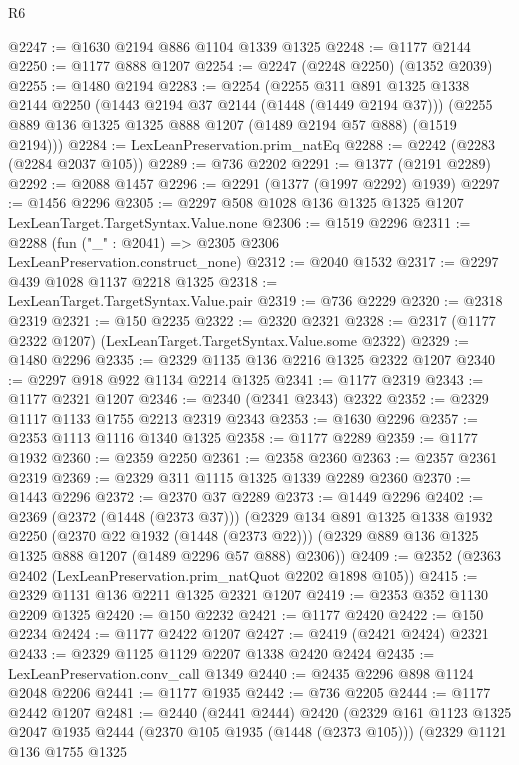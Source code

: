 \begin{lexlean}{R6}
\begin{coremodule}
@2247 := @1630 @2194 @886 @1104 @1339 @1325
@2248 := @1177 @2144
@2250 := @1177 @888 @1207
@2254 := @2247 (@2248 @2250) (@1352 @2039)
@2255 := @1480 @2194
@2283 := @2254
    (@2255
      @311
      @891
      @1325
      @1338
      @2144
      @2250
      (@1443 @2194 @37 @2144 (@1448 (@1449 @2194 @37)))
      (@2255 @889 @136 @1325 @1325 @888 @1207 (@1489 @2194 @57 @888) (@1519 @2194)))
@2284 := LexLeanPreservation.prim_natEq
@2288 := @2242 (@2283 (@2284 @2037 @105))
@2289 := @736 @2202
@2291 := @1377 (@2191 @2289)
@2292 := @2088 @1457
@2296 := @2291 (@1377 (@1997 @2292) @1939)
@2297 := @1456 @2296
@2305 := @2297 @508 @1028 @136 @1325 @1325 @1207 LexLeanTarget.TargetSyntax.Value.none
@2306 := @1519 @2296
@2311 := @2288 (fun ("_" : @2041) => @2305 @2306 LexLeanPreservation.construct_none)
@2312 := @2040 @1532
@2317 := @2297 @439 @1028 @1137 @2218 @1325
@2318 := LexLeanTarget.TargetSyntax.Value.pair
@2319 := @736 @2229
@2320 := @2318 @2319
@2321 := @150 @2235
@2322 := @2320 @2321
@2328 := @2317 (@1177 @2322 @1207) (LexLeanTarget.TargetSyntax.Value.some @2322)
@2329 := @1480 @2296
@2335 := @2329 @1135 @136 @2216 @1325 @2322 @1207
@2340 := @2297 @918 @922 @1134 @2214 @1325
@2341 := @1177 @2319
@2343 := @1177 @2321 @1207
@2346 := @2340 (@2341 @2343) @2322
@2352 := @2329 @1117 @1133 @1755 @2213 @2319 @2343
@2353 := @1630 @2296
@2357 := @2353 @1113 @1116 @1340 @1325
@2358 := @1177 @2289
@2359 := @1177 @1932
@2360 := @2359 @2250
@2361 := @2358 @2360
@2363 := @2357 @2361 @2319
@2369 := @2329 @311 @1115 @1325 @1339 @2289 @2360
@2370 := @1443 @2296
@2372 := @2370 @37 @2289
@2373 := @1449 @2296
@2402 := @2369
    (@2372 (@1448 (@2373 @37)))
    (@2329
      @134
      @891
      @1325
      @1338
      @1932
      @2250
      (@2370 @22 @1932 (@1448 (@2373 @22)))
      (@2329 @889 @136 @1325 @1325 @888 @1207 (@1489 @2296 @57 @888) @2306))
@2409 := @2352 (@2363 @2402 (LexLeanPreservation.prim_natQuot @2202 @1898 @105))
@2415 := @2329 @1131 @136 @2211 @1325 @2321 @1207
@2419 := @2353 @352 @1130 @2209 @1325
@2420 := @150 @2232
@2421 := @1177 @2420
@2422 := @150 @2234
@2424 := @1177 @2422 @1207
@2427 := @2419 (@2421 @2424) @2321
@2433 := @2329 @1125 @1129 @2207 @1338 @2420 @2424
@2435 := LexLeanPreservation.conv_call @1349
@2440 := @2435 @2296 @898 @1124 @2048 @2206
@2441 := @1177 @1935
@2442 := @736 @2205
@2444 := @1177 @2442 @1207
@2481 := @2440
    (@2441 @2444)
    @2420
    (@2329
      @161
      @1123
      @1325
      @2047
      @1935
      @2444
      (@2370 @105 @1935 (@1448 (@2373 @105)))
      (@2329
        @1121
        @136
        @1755
        @1325

\end{coremodule}
\end{lexlean}
